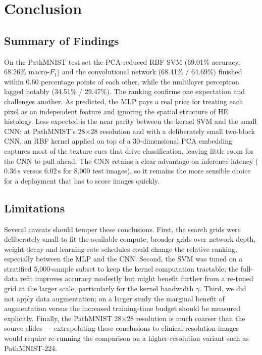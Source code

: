 \documentclass[../main.tex]{subfiles}
\begin{document}
\section{Conclusion}

\subsection{Summary of Findings}
\noindent
On the PathMNIST test set the
\gls{PCA}-reduced \gls{RBF} \gls{SVM} (69.01\% accuracy,
68.26\% macro-$F_{1}$) and the convolutional network
(68.41\% / 64.69\%) finished within 0.60
percentage points of each other, while the multilayer perceptron lagged
notably (34.51\% / 29.47\%). The ranking confirms one
expectation and challenges another. As predicted, the \gls{MLP} pays a
real price for treating each pixel as an independent feature and ignoring
the spatial structure of \gls{HE} histology. Less expected is the near
parity between the kernel \gls{SVM} and the small \gls{CNN}: at
PathMNIST's 28$\times$28 resolution and with a deliberately small
two-block \gls{CNN}, an \gls{RBF} kernel applied on top of a
30-dimensional \gls{PCA} embedding captures most of the texture cues
that drive classification, leaving little room for the \gls{CNN} to
pull ahead. The \gls{CNN} retains a clear advantage on inference
latency ($0.36\,\text{s}$ versus $6.02\,\text{s}$ for
8{,}000 test images), so it remains the more sensible choice for a
deployment that has to score images quickly.

\subsection{Limitations}
\noindent
Several caveats should temper these conclusions. First, the search grids
were deliberately small to fit the available compute; broader grids over
network depth, weight decay and learning-rate schedules could change the
relative ranking, especially between the \gls{MLP} and the \gls{CNN}.
Second, the SVM was tuned on a stratified 5{,}000-sample subset to keep
the kernel computation tractable; the full-data refit improves accuracy
modestly but might benefit further from a re-tuned grid at the larger
scale, particularly for the kernel bandwidth $\gamma$. Third, we did not
apply data augmentation; on a larger study the marginal benefit of
augmentation versus the increased training-time budget should be measured
explicitly. Finally, the PathMNIST 28$\times$28 resolution is much
coarser than the source slides — extrapolating these conclusions to
clinical-resolution images would require re-running the comparison on a
higher-resolution variant such as PathMNIST-224.
\end{document}

